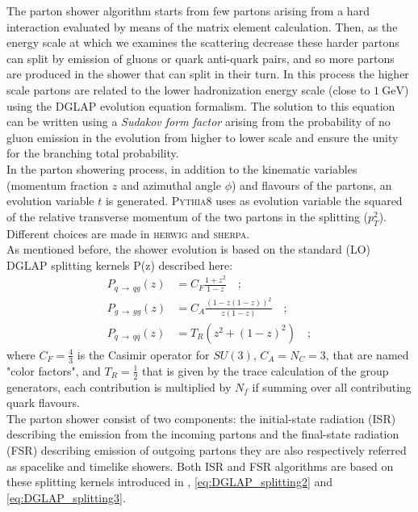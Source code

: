 The parton shower algorithm starts from few partons arising from a hard interaction evaluated by means of the matrix element calculation. Then, as the energy scale at which we examines the scattering decrease these harder partons can split by emission of gluons or quark anti-quark pairs, and so more partons are produced in the shower that can split in their turn. In this process the higher scale partons are related to the lower hadronization energy scale (close to $1 \ \mathrm{GeV}$) using the DGLAP evolution equation formalism. The solution to this equation can be written using a \textit{Sudakov form factor} arising from the probability of no gluon emission in the evolution from higher to lower scale and ensure the unity for the branching total probability.
\\
In the parton showering process, in addition to the kinematic variables (momentum fraction $z$ and azimuthal angle $\phi$) and flavours of the partons, an evolution variable $t$ is generated. \textsc{Pythia8} uses as  evolution variable the squared of the relative transverse momentum of the two partons in the splitting ($p_T^2$). Different choices are made in \textsc{herwig} and \textsc{sherpa}.
\\
As mentioned before, the shower evolution is based on the standard (LO) DGLAP splitting kernels P(z) described here:
\begin{align}
P_{q\,\rightarrow\,qg}(z) & = C_F\frac{1+z^2}{1-z}\quad ; \label{eq:DGLAP_splitting1}\\
P_{g\,\rightarrow\,gg}(z) & = C_A\frac{(1-z(1-z))^2}{z(1-z)}\quad ; \label{eq:DGLAP_splitting2}\\
P_{q\,\rightarrow\,q\overline{q}}(z) & = T_R(z^2+(1-z)^2)\quad ; \label{eq:DGLAP_splitting3}
\end{align} 
where $C_F=\frac{4}{3}$ is the Casimir operator for $SU(3)$, $C_A=N_C=3$, that are named "color factors", and $T_R=\frac{1}{2}$ that is given by the trace calculation of the group generators, each contribution is multiplied by $N_f$ if summing over all contributing quark flavours.
\\
The parton shower consist of two components: the initial-state radiation (ISR) describing the emission from the incoming partons and the final-state radiation (FSR) describing emission of outgoing partons they are also respectively referred as spacelike and timelike showers.
Both ISR and FSR algorithms are based on these splitting kernels introduced in , \ref{eq:DGLAP_splitting2} and \ref{eq:DGLAP_splitting3}.
